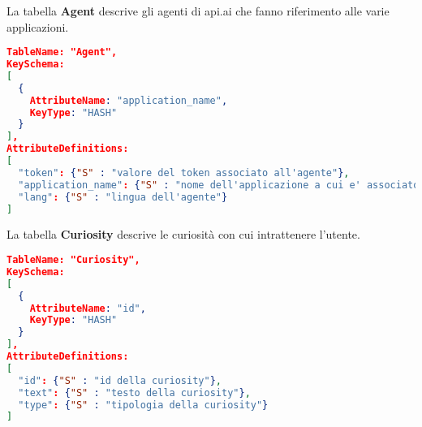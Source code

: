 La tabella \textbf{Agent} descrive gli agenti di api.ai che fanno riferimento alle varie applicazioni.
\begin{lstlisting}[language=json,firstnumber=1]
TableName: "Agent",
KeySchema:
[
  {
    AttributeName: "application_name",
    KeyType: "HASH"
  }
],
AttributeDefinitions:
[
  "token": {"S" : "valore del token associato all'agente"},
  "application_name": {"S" : "nome dell'applicazione a cui e' associato l'agente"},
  "lang": {"S" : "lingua dell'agente"}
]
\end{lstlisting}

La tabella \textbf{Curiosity} descrive le curiosità con cui intrattenere l'utente.
\begin{lstlisting}[language=json,firstnumber=1]
TableName: "Curiosity",
KeySchema:
[
  {
    AttributeName: "id",
    KeyType: "HASH"
  }
],
AttributeDefinitions:
[
  "id": {"S" : "id della curiosity"},
  "text": {"S" : "testo della curiosity"},
  "type": {"S" : "tipologia della curiosity"}
]
\end{lstlisting}
